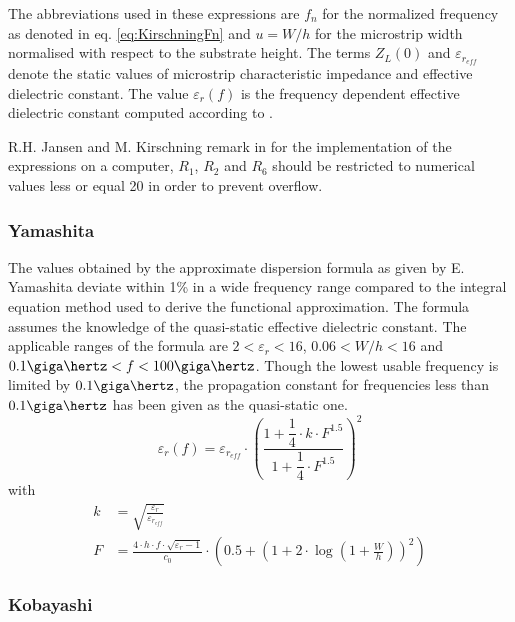 \documentclass[10pt]{report}
\begin{document}
The abbreviations used in these expressions are $f_n$ for the
normalized frequency as denoted in eq. \eqref{eq:KirschningFn} and $u
= W/h$ for the microstrip width normalised with respect to the
substrate height.  The terms $Z_L(0)$ and $\varepsilon_{r_{eff}}$
denote the static values of microstrip characteristic impedance and
effective dielectric constant.  The value $\varepsilon_{r}(f)$ is the
frequency dependent effective dielectric constant computed according
to \cite{Kirschning3}.

\addvspace{12pt}

R.H. Jansen and M. Kirschning remark in \cite{Kirschning1} for the
implementation of the expressions on a computer, $R_1$, $R_2$ and
$R_6$ should be restricted to numerical values less or equal 20 in
order to prevent overflow.

\subsubsection{Yamashita}

The values obtained by the approximate dispersion formula as given by
E. Yamashita \cite{Yamashita} deviate within 1\% in a wide frequency
range compared to the integral equation method used to derive the
functional approximation.  The formula assumes the knowledge of the
quasi-static effective dielectric constant.  The applicable ranges of
the formula are $2 < \varepsilon_r < 16$, $0.06 < W/h < 16$ and
$0.1\giga\hertz < f < 100\giga\hertz$.  Though the lowest usable
frequency is limited by $0.1\giga\hertz$, the propagation constant for
frequencies less than $0.1\giga\hertz$ has been given as the
quasi-static one.
\begin{equation}
\varepsilon_{r}(f) = \varepsilon_{r_{eff}}\cdot \left(\frac{1 + \dfrac{1}{4}\cdot k\cdot F^{1.5}}{1 + \dfrac{1}{4}\cdot F^{1.5}}\right)^{2}
\end{equation}
with
\begin{align}
k &= \sqrt{\frac{\varepsilon_{r}}{\varepsilon_{r_{eff}}}}\\
F &= \frac{4\cdot h\cdot f\cdot \sqrt{\varepsilon_{r} - 1}}{c_{0}} \cdot \left(0.5 + \left(1 + 2 \cdot \log\left(1 + \frac{W}{h}\right)\right)^{2}\right)
\end{align}

\subsubsection{Kobayashi}
\end{document}
